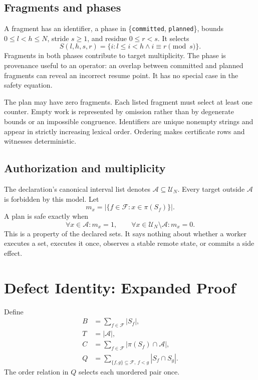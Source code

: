 \documentclass[11pt,onecolumn]{IEEEtran}
\newcommand{\U}{\mathcal U}
\newcommand{\A}{\mathcal A}
\newcommand{\F}{\mathcal F}
\newcommand{\code}[1]{\texttt{#1}}
\begin{document}
\subsection{Fragments and phases}
A fragment has an identifier, a phase in \{\code{committed}, \code{planned}\}, bounds $0\leq l<h\leq N$, stride $s\geq1$, and residue $0\leq r<s$.  It selects
\begin{equation}
 S(l,h,s,r)=\{i:l\leq i<h\wedge i\equiv r\pmod s\}.
\end{equation}
Fragments in both phases contribute to target multiplicity.  The phase is provenance useful to an operator: an overlap between committed and planned fragments can reveal an incorrect resume point.  It has no special case in the safety equation.

The plan may have zero fragments.  Each listed fragment must select at least one counter.  Empty work is represented by omission rather than by degenerate bounds or an impossible congruence.  Identifiers are unique nonempty strings and appear in strictly increasing lexical order.  Ordering makes certificate rows and witnesses deterministic.

\subsection{Authorization and multiplicity}
The declaration's canonical interval list denotes $\A\subseteq\U_N$.  Every target outside $\A$ is forbidden by this model.  Let
\begin{equation}
 m_x=|\{f\in\F:x\in\pi(S_f)\}|.
\end{equation}
A plan is safe exactly when
\begin{equation}
  \forall x\in\A:m_x=1,
  \qquad
  \forall x\in\U_N\setminus\A:m_x=0.
\end{equation}
This is a property of the declared sets.  It says nothing about whether a worker executes a set, executes it once, observes a stable remote state, or commits a side effect.

\section{Defect Identity: Expanded Proof}
Define
\begin{align}
 B&=\sum_{f\in\F}|S_f|,\\
 T&=|\A|,\\
 C&=\sum_{f\in\F}|\pi(S_f)\cap\A|,\\
 Q&=\sum_{\{f,g\}\subseteq\F,\ f<g}|S_f\cap S_g|.
\end{align}
The order relation in $Q$ selects each unordered pair once.
\end{document}
